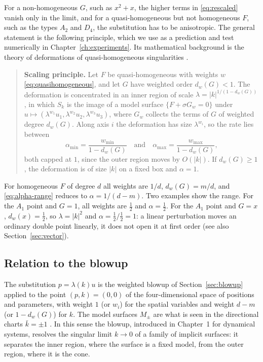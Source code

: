 For a non-homogeneous $G$, such as $x^2+x$, the higher terms in
\eqref{eq:rescaled} vanish only in the limit, and for a quasi-homogeneous but
not homogeneous $F$, such as the types $A_2$ and $D_4$, the substitution has
to be anisotropic. The general statement is the following principle, which
we use as a prediction and test numerically in Chapter~\ref{ch:experiments}.
Its mathematical background is the theory of deformations of quasi-homogeneous
singularities \cite{arnold2012singularities,greuel2007introduction}.

\begin{quote}
\textbf{Scaling principle.} Let $F$ be quasi-homogeneous with weights $w$
\eqref{eq:quasihomogeneous}, and let $G$ have weighted order $d_w(G)<1$. The
deformation is concentrated in an inner region of scale
$\lambda=|k|^{1/(1-d_w(G))}$, in which $S_k$ is the image of a model surface
$\{F+\sigma G_w=0\}$ under $u\mapsto(\lambda^{w_1}u_1,\lambda^{w_2}u_2,\lambda^{w_3}u_3)$,
where $G_w$ collects the terms of $G$ of weighted degree $d_w(G)$. Along axis
$i$ the deformation has size $\lambda^{w_i}$, so the rate lies between
\begin{equation}
\label{eq:alpha-range}
\alpha_{\min}=\frac{w_{\min}}{1-d_w(G)}\quad\text{and}\quad
\alpha_{\max}=\frac{w_{\max}}{1-d_w(G)},
\end{equation}
both capped at $1$, since the outer region moves by $O(|k|)$. If
$d_w(G)\ge1$, the deformation is of size $|k|$ on a fixed box and $\alpha=1$.
\end{quote}

For homogeneous $F$ of degree $d$ all weights are $1/d$, $d_w(G)=m/d$, and
\eqref{eq:alpha-range} reduces to $\alpha=1/(d-m)$. Two examples show the range.
For the $A_1$ point and $G=1$, all weights are $\frac12$ and $\alpha=\frac12$.
For the $A_1$ point and $G=x$, $d_w(x)=\frac12$, so $\lambda=|k|^2$ and
$\alpha=\frac12/\frac12=1$: a linear perturbation moves an ordinary double
point linearly, it does not open it at first order (see also
Section~\ref{sec:vector}).

\subsection{Relation to the blowup}

The substitution $p=\lambda(k)u$ is the weighted blowup of
Section~\ref{sec:blowup} applied to the point $(p,k)=(0,0)$ of the
four-dimensional space of positions and parameters, with weight $1$ (or $w_i$)
for the spatial variables and weight $d-m$ (or $1-d_w(G)$) for $k$. The model
surfaces $M_\pm$ are what is seen in the directional charts $\bar k=\pm1$
\cite{kristiansen2019resolution}. In this sense the blowup, introduced in
Chapter~1 for dynamical systems, resolves the singular limit $k\to0$ of a
family of implicit surfaces: it separates the inner region, where the surface
is a fixed model, from the outer region, where it is the cone.

